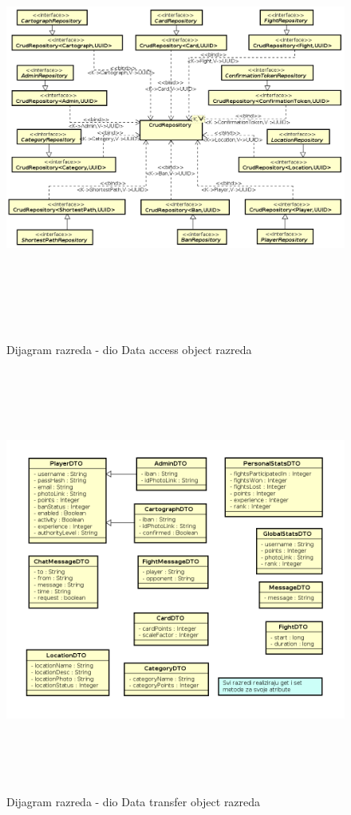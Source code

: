 			\begin{figure}[H]
				\includegraphics[width=\linewidth, height=14cm]{dijagrami/dao_diagram}				
				\centering
				\caption{Dijagram razreda - dio Data access object razreda}
				\label{}
			\end{figure}
		
			\begin{figure}[H]
				\includegraphics[width=\linewidth, height=14cm]{dijagrami/dto_diagram}				
				\centering
				\caption{Dijagram razreda - dio Data transfer object razreda}
				\label{}
			\end{figure}
		
